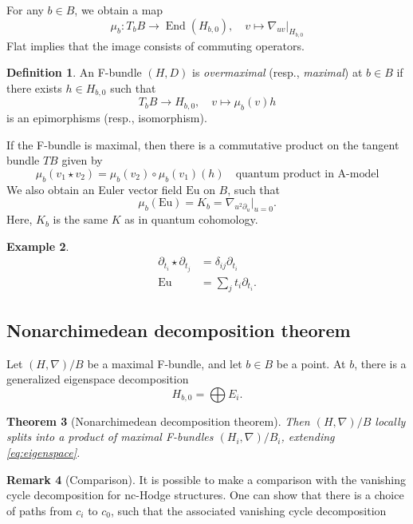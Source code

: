 \documentclass[11pt, reqno]{amsart}
\numberwithin{equation}{section}
\theoremstyle{plain}
\newtheorem{theorem}{Theorem}[section]
\theoremstyle{definition}
\newtheorem{definition}[theorem]{Definition}
\newtheorem{example}[theorem]{Example}
\newtheorem{remark}[theorem]{Remark}
\theoremstyle{italicsname}
\DeclareMathOperator{\End}{End}
\newcommand{\euler}{\mathrm{Eu}}
\begin{document}
For any $b \in B$, we obtain a map
\begin{equation*}
    \mu_b:T_b B \to \End(H_{b, 0}), \quad v \mapsto \nabla_{uv}|_{H_{b, 0}}
\end{equation*}
Flat implies that the image consists of commuting operators. 

\begin{definition}
\label{def:overmaximal}
    An F-bundle $(H, D)$ is \emph{overmaximal} (resp., \emph{maximal}) at $b \in B$ if there exists $h \in H_{b, 0}$ such that 
    \[
        T_b B \to H_{b, 0}, \quad v \mapsto \mu_b(v)h
    \]
    is an epimorphisms (resp., isomorphism).
\end{definition}

If the F-bundle is maximal, then there is a commutative product on the tangent bundle $TB$ given by
\[
    \mu_b(v_1 \star v_2) = \mu_b(v_2) \circ \mu_b(v_1)(h) \quad \textrm{quantum product in A-model}
\]
We also obtain an Euler vector field $\euler$ on $B$, such that 
\[
    \mu_b(\euler) = K_b = \nabla_{u^2 \partial_u}|_{u = 0}.
\]
Here, $K_b$ is the same $K$ as in quantum cohomology.

\begin{example}
\begin{align*}
    \partial_{t_i} \star \partial_{t_j} &= \delta_{ij} \partial_{t_i} \\
    \euler &= \sum_j t_i \partial_{t_i}.
\end{align*}
\end{example}

\subsection{Nonarchimedean decomposition theorem}

Let $(H, \nabla)/B$ be a maximal F-bundle, and let $b \in B$ be a point. At $b$, there is a generalized eigenspace decomposition
\begin{equation}
\label{eq:eigenspace}
    H_{b, 0} = \bigoplus E_i.
\end{equation}

\begin{theorem}[Nonarchimedean decomposition theorem]
\label{thm:nonarch_dec_thm}
    Then $(H, \nabla)/B$ locally splits into a product of maximal F-bundles $(H_i, \nabla)/B_i$, extending \eqref{eq:eigenspace}.
\end{theorem}



\begin{remark}[Comparison]
    It is possible to make a comparison with the vanishing cycle decomposition for nc-Hodge structures. One can show that there is a choice of paths from $c_i$ to $c_0$, such that the associated vanishing cycle decomposition 
\end{remark}
\end{document}
